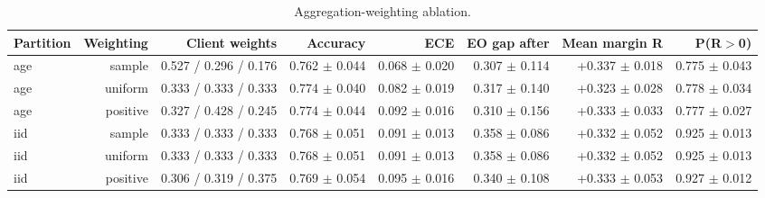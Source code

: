 \begin{table}[t]
\centering
\small
\begin{tabular}{lrrrrrrr}
\toprule
Partition & Weighting & Client weights & Accuracy & ECE & EO gap after & Mean margin R & P(R$>$0) \\
\midrule
age & sample & 0.527 / 0.296 / 0.176 & 0.762 $\pm$ 0.044 & 0.068 $\pm$ 0.020 & 0.307 $\pm$ 0.114 & +0.337 $\pm$ 0.018 & 0.775 $\pm$ 0.043 \\
age & uniform & 0.333 / 0.333 / 0.333 & 0.774 $\pm$ 0.040 & 0.082 $\pm$ 0.019 & 0.317 $\pm$ 0.140 & +0.323 $\pm$ 0.028 & 0.778 $\pm$ 0.034 \\
age & positive & 0.327 / 0.428 / 0.245 & 0.774 $\pm$ 0.044 & 0.092 $\pm$ 0.016 & 0.310 $\pm$ 0.156 & +0.333 $\pm$ 0.033 & 0.777 $\pm$ 0.027 \\
iid & sample & 0.333 / 0.333 / 0.333 & 0.768 $\pm$ 0.051 & 0.091 $\pm$ 0.013 & 0.358 $\pm$ 0.086 & +0.332 $\pm$ 0.052 & 0.925 $\pm$ 0.013 \\
iid & uniform & 0.333 / 0.333 / 0.333 & 0.768 $\pm$ 0.051 & 0.091 $\pm$ 0.013 & 0.358 $\pm$ 0.086 & +0.332 $\pm$ 0.052 & 0.925 $\pm$ 0.013 \\
iid & positive & 0.306 / 0.319 / 0.375 & 0.769 $\pm$ 0.054 & 0.095 $\pm$ 0.016 & 0.340 $\pm$ 0.108 & +0.333 $\pm$ 0.053 & 0.927 $\pm$ 0.012 \\
\bottomrule
\end{tabular}
\caption{Aggregation-weighting ablation.}
\label{tab:weighting}
\end{table}